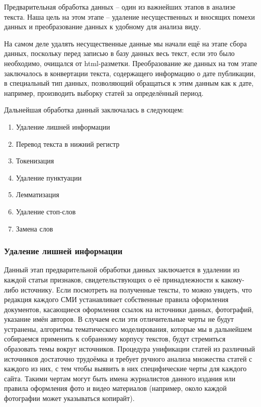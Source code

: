 Предварительная обработка данных -- один из важнейших этапов в анализе текста. Наша цель на этом этапе -- удаление несущественных и вносящих помехи данных и преобразование данных к удобному для анализа виду.

На самом деле удалять несущественные данные мы начали ещё на этапе сбора данных, поскольку перед записью в базу данных весь текст, если это было необходимо, очищался от html-разметки. Преобразование же данных на том этапе заключалось в конвертации текста, содержащего информацию о дате публикации, в специальный тип данных, позволяющий обращаться к этим данным как к дате, например, производить выборку статей за определённый период.

Дальнейшая обработка данный заключалась в следующем:

\begin{enumerate}
\item Удаление лишней информации
\item Перевод текста в нижний регистр
\item Токенизация %
\item Удаление пунктуации
\item Лемматизация
\item Удаление стоп-слов
\item Замена слов
\end{enumerate}

\subsubsection{Удаление лишней информации}
Данный этап предварительной обработки данных заключается в удалении из каждой статьи признаков, свидетельствующих о её принадлежности к какому-либо источнику. Если посмотреть на полученные тексты, то можно увидеть, что редакция каждого СМИ устанавливает собственные правила оформления документов, касающиеся оформления ссылок на источники данных, фотографий, указание имён авторов. В случаем если эти отличительные черты не будут устранены, алгоритмы тематического моделирования, которые мы в дальнейшем собираемся применить к собранному корпусу текстов, будут стремиться образовать темы вокруг источников. Процедура унификации статей из различный источников достаточно трудоёмка и требует ручного анализа множества статей с каждого из них, с тем чтобы выявить в них специфические черты для каждого сайта. Такими чертам могут быть имена журналистов данного издания или правила оформления фото и видео материалов (например, около каждой фотографии может указываться копирайт).

